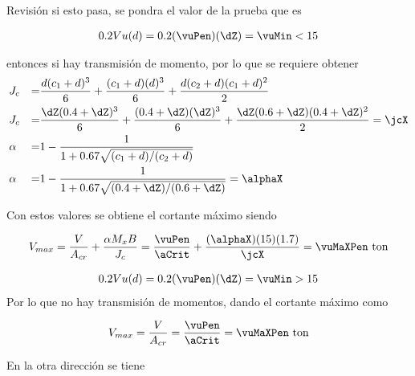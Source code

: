 \documentclass[11pt,a4paper,fleqn]{article}
\begin{document}
 \FPifgt \mxZ \vuMin  {} \else {} \fi
Revisión si esto pasa, se pondra el valor de la prueba que es \pruebaVer
{}  
	{
	\begin{align*}
		0.2Vu(d)=0.2(\vuPen)(\dZ)=\vuMin<\mxZ 
	\end{align*}

entonces si hay transmisión de momento, por lo que se requiere obtener 
	\begin{align*}
		&J_c&=&\frac{d(c_1+d)^3}{6}+\frac{(c_1+d)(d)^3}{6}+\frac{d(c_2+d)(c_1+d)^2}{2}\\
		&J_c&=&\frac{\dZ(\caZ+\dZ)^3}{6}+\frac{(\caZ+\dZ)(\dZ)^3}{6}+\frac{\dZ(\cbZ+\dZ)(\caZ+\dZ)^2}{2}=\jcX\\
		&\alpha&=&1-\frac{1}{1+0.67\sqrt{(c_1+d)/(c_2+d)}}\\
		&\alpha&=&1-\frac{1}{1+0.67\sqrt{(\caZ+\dZ)/(\cbZ+\dZ)}}=\alphaX
	\end{align*}
	
	Con estos valores se obtiene el cortante máximo siendo
	
	\begin{align*}
		V_{max}=\frac{V}{A_{cr}}+\frac{\alpha M_x B}{J_c}=\frac{\vuPen}{\aCrit}+\frac{(\alphaX)(\mxZ)(\bZ)}{\jcX}=\vuMaXPen \text{ ton}
	\end{align*}
	} 
	{
	\begin{align*}
		0.2Vu(d)=0.2(\vuPen)(\dZ)=\vuMin>\mxZ 
	\end{align*}
	Por lo que no hay transmisión de momentos, dando el cortante máximo como
	
	
	\begin{align*}
		V_{max}=\frac{V}{A_{cr}}=\frac{\vuPen}{\aCrit}=\vuMaXPen \text{ ton}
	\end{align*}
  }

En la otra dirección se tiene
\end{document}
